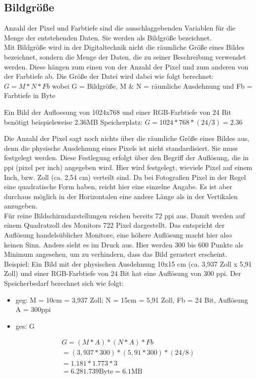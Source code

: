 \documentclass[11pt]{article}
\begin{document}
\subsection{Bildgröße}
\label{sec:orgf50c9fc}
Anzahl der Pixel und Farbtiefe sind die ausschlaggebenden Variablen für die Menge der entstehenden Daten. Sie werden als Bildgröße bezeichnet.\\
Mit Bildgröße wird in der Digitaltechnik nicht die räumliche Größe eines Bildes bezeichnet, sondern die Menge der Daten, die zu seiner Beschreibung verwendet werden. Diese hängen zum einen von der Anzahl der Pixel und zum anderen von der Farbtiefe ab. Die Größe der Datei wird dabei wie folgt berechnet:
\(G = M * N * Fb\) wobei G = Bildgröße, M \& N = räumliche Ausdehnung und Fb = Farbtiefe in Byte

Ein Bild der Aufloesung von 1024x768 und einer RGB-Farbtiefe von 24 Bit benötigt beispielsweise 2.36MB Speicherplatz: \(G = 1024 * 768 * (24/3) = 2.36\)

Die Anzahl der Pixel sagt noch nichts über die räumliche Größe eines Bildes aus, denn die physische Ausdehnung eines Pixels ist nicht standardisiert. Sie muss festgelegt werden. Diese Festlegung erfolgt über den Begriff der Auflösung, die in ppi (pixel per inch) angegeben wird. Hier wird festgelegt, wieviele Pixel auf einem Inch, bzw. Zoll (ca. 2,54 cm) verteilt sind. Da bei Fotografien Pixel in der Regel eine quadratische Form haben, reicht hier eine einzelne Angabe. Es ist aber durchaus möglich in der Horizontalen eine andere Länge als in der Vertikalen anzugeben.\\
Für reine Bildschirmdarstellungen reichen bereits 72 ppi aus. Damit werden auf einem Quadratzoll des Monitors 722 Pixel dargestellt. Das entspricht der Auflösung handelsüblicher Monitore, eine höhere Auflösung macht hier also keinen Sinn. Anders sieht es im Druck aus. Hier werden 300 bis 600 Punkte als Minimum angesehen, um zu verhindern, dass das Bild gerastert erscheint.\\
Beispiel: Ein Bild mit der physischen Ausdehnung 10x15 cm (ca. 3,937 Zoll x 5,91 Zoll) und einer RGB-Farbtiefe von 24 Bit hat eine Auflösung von 300 ppi. Der Speicherbedarf berechnet sich wie folgt:
\begin{itemize}
\item geg: M = 10cm = 3,937 Zoll; N = 15cm = 5,91 Zoll, Fb =  24 Bit, Auflösung A = 300ppi
\end{itemize}
\begin{itemize}
\item ges: G
\end{itemize}
\begin{equation}
\begin{split}
G = (M*A) * (N*A) * Fb\\
  = (3,937 * 300) * (5,91 * 300) * (24/8)\\
  = 1.181 * 1.773 * 3\\
  = 6.281.739 \text{Byte} = 6.1 \text{MB}
\end{split}
\end{equation}
\end{document}
